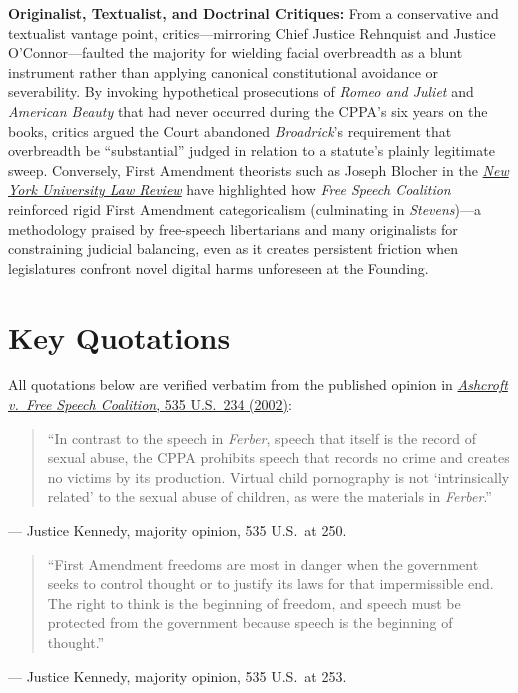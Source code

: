\documentclass[12pt]{article}
\begin{document}
\textbf{Originalist, Textualist, and Doctrinal Critiques:} From a conservative and textualist vantage point, critics---mirroring Chief Justice Rehnquist and Justice O'Connor---faulted the majority for wielding facial overbreadth as a blunt instrument rather than applying canonical constitutional avoidance or severability. By invoking hypothetical prosecutions of \textit{Romeo and Juliet} and \textit{American Beauty} that had never occurred during the CPPA's six years on the books, critics argued the Court abandoned \textit{Broadrick}'s requirement that overbreadth be ``substantial'' judged in relation to a statute's plainly legitimate sweep. Conversely, First Amendment theorists such as Joseph Blocher in the \href{https://nyulawreview.org/wp-content/uploads/2018/08/NYULawReview-84-2-Blocher.pdf}{\textit{New York University Law Review}} have highlighted how \textit{Free Speech Coalition} reinforced rigid First Amendment categoricalism (culminating in \textit{Stevens})---a methodology praised by free-speech libertarians and many originalists for constraining judicial balancing, even as it creates persistent friction when legislatures confront novel digital harms unforeseen at the Founding.

\section{Key Quotations}

All quotations below are verified verbatim from the published opinion in \href{https://supreme.justia.com/cases/federal/us/535/234/}{\textit{Ashcroft v.\ Free Speech Coalition}, 535 U.S.\ 234 (2002)}:

\begin{quote}
``In contrast to the speech in \textit{Ferber}, speech that itself is the record of sexual abuse, the CPPA prohibits speech that records no crime and creates no victims by its production. Virtual child pornography is not `intrinsically related' to the sexual abuse of children, as were the materials in \textit{Ferber}.''
\end{quote}
\noindent --- Justice Kennedy, majority opinion, 535 U.S.\ at 250.

\begin{quote}
``First Amendment freedoms are most in danger when the government seeks to control thought or to justify its laws for that impermissible end. The right to think is the beginning of freedom, and speech must be protected from the government because speech is the beginning of thought.''
\end{quote}
\noindent --- Justice Kennedy, majority opinion, 535 U.S.\ at 253.
\end{document}
